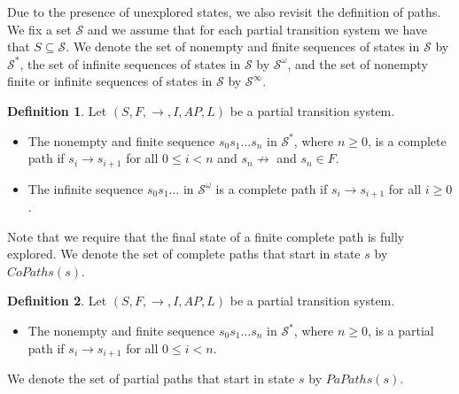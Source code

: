 \documentclass[12pt]{article}
\theoremstyle{definition}
\newtheorem{definition}{Definition}
\newenvironment{franck}{\color{red}}{\color{black}}
\begin{document}
Due to the presence of unexplored states, we also revisit the definition of paths.  We fix a set $\mathcal{S}$ and we assume that for each partial transition system we have that $S \subseteq \mathcal{S}$.  We denote the set of nonempty and finite sequences of states in $\mathcal{S}$ by $\mathcal{S}^*$, the set of infinite sequences of states in $\mathcal{S}$ by $\mathcal{S}^{\omega}$, and the set of nonempty finite or infinite sequences of states in $\mathcal{S}$ by $\mathcal{S}^{\infty}$.

\begin{definition}
\label{definition:complete-path}
Let $(S, F, \rightarrow, I, \mathit{AP}, L)$ be a partial transition system.
\begin{itemize}
\item 
The nonempty and finite sequence $s_0 s_1 \ldots s_n$ in $\mathcal{S}^*$, where $n \geq 0$, is a \begin{franck}complete\end{franck} path if $s_i \rightarrow s_{i+1}$ for all $0 \leq i < n$ and $s_n \not\rightarrow$ and $s_n \in F$.
\item 
The infinite sequence $s_0 s_1 \ldots$ in $\mathcal{S}^{\omega}$ is a \begin{franck}complete\end{franck} path if $s_i \rightarrow s_{i+1}$ for all $i \geq 0$. 
\end{itemize}
\end{definition}

Note that we require that the final state of a finite \begin{franck}complete\end{franck} path is fully explored.  \begin{franck}We denote the set of complete paths that start in state $s$ by $\mathit{CoPaths}(s)$.\end{franck}

\begin{definition}
\label{definition:partial-path}
Let $(S, F, \rightarrow, I, \mathit{AP}, L)$ be a partial transition system.
\begin{itemize}
\item 
The nonempty and finite sequence $s_0 s_1 \ldots s_n$ in $\mathcal{S}^*$, where $n \geq 0$, is a partial path if $s_i \rightarrow s_{i+1}$ for all $0 \leq i < n$.
\end{itemize}
\end{definition}

\begin{franck}
We denote the set of partial paths that start in state $s$ by $\mathit{PaPaths}(s)$.
\end{franck}
\end{document}
